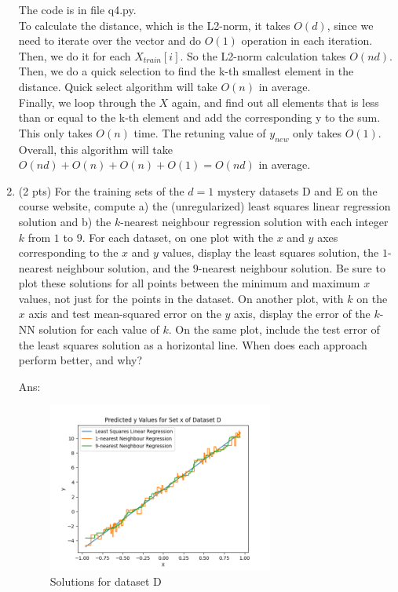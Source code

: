 \documentclass[10pt,letter,notitlepage]{article}
\newcommand{\ans}[1]{{\color{orange}\textsf{Ans}: #1}}
\newcounter{exercise}
\begin{document}
\begin{exercise}
\begin{enumerate}
{      \color{orange}
      The code is in file q4.py. \\
      To calculate the distance, which is the L2-norm, it takes $O(d)$, since we need to iterate over the vector and 
      do $O(1)$ operation in each iteration. Then, we do it for each $X_{train}[i]$. So the L2-norm calculation takes $O(nd)$.\\
      Then, we do a quick selection to find the k-th smallest element in the distance. Quick select algorithm will take $O(n)$ in average. \\
      Finally, we loop through the $X$ again, and find out all elements that is less than or equal to the k-th element and add the 
      corresponding y to the sum. This only takes $O(n)$ time. 
      The retuning value of $y_{new}$ only takes $O(1)$. \\
      Overall, this algorithm will take $O(nd) + O(n) + O(n) + O(1) = O(nd)$ in average. 
    }
    \item (2 pts) For the training sets of the $d=1$ mystery datasets D and E on the course website, compute a) the (unregularized) least squares linear regression solution and b) the $k$-nearest neighbour regression solution with each integer $k$ from $1$ to $9$.
      For each dataset, on one plot with the $x$ and $y$ axes corresponding to the $x$ and $y$ values, display the least squares solution, the $1$-nearest neighbour solution, and the $9$-nearest neighbour solution. 
      Be sure to plot these solutions for all points between the minimum and maximum $x$ values, not just for the points in the dataset.
      On another plot, with $k$ on the $x$ axis and test mean-squared error on the $y$ axis, display the error of the $k$-NN solution for each value of $k$. 
      On the same plot, include the test error of the least squares solution as a horizontal line.
      When does each approach perform better, and why? 

    \ans{
      \begin{figure}[H]
      \centering
      \includegraphics[width=0.7\textwidth]{Exercise4_dataset_D_all_points.png}
      \caption{Solutions for dataset D}
      \end{figure}

}
\end{enumerate}
\end{exercise}
\end{document}
